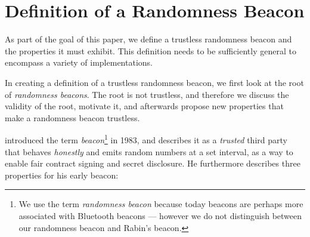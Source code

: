 \section{Definition of a Randomness Beacon}\label{sec:beacons}

As part of the goal of this paper, we define a trustless randomness beacon and the properties it must exhibit.
This definition needs to be sufficiently general to encompass a variety of implementations.






In creating a definition of a trustless randomness beacon, we first look at the root of \emph{randomness beacons}.
The root is not trustless, and therefore we discuss the validity of the root, motivate it, and afterwards propose new properties that make a randomness beacon trustless.

\citet{rabin1983transaction} introduced the term \emph{beacon}\footnote{We use the term \emph{randomness beacon} because today beacons are perhaps more associated with Bluetooth beacons --- however we do not distinguish between our randomness beacon and Rabin's beacon.} in 1983, and describes it as a \emph{trusted} third party that behaves \emph{honestly} and emits random numbers at a set interval, as a way to enable fair contract signing and secret disclosure.
He furthermore describes three properties for his early beacon:

